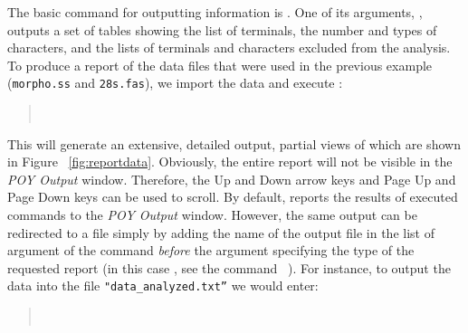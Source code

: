 {The basic command for outputting information is . One of its arguments, , 
outputs a set of tables showing the list of terminals, the number and types of characters, and the lists of terminals and 
characters excluded from the analysis. To produce a report of the data files that were used in the previous example 
(\texttt{morpho.ss} and \texttt{28s.fas}), we import the data and execute :
\begin{quote}
    \\
\end{quote}
This will generate an extensive, detailed output, partial views of which are shown in Figure ~\ref{fig:reportdata}. 
Obviously, the entire report will not be visible in the \emph{POY Output} window. Therefore, the Up and Down 
arrow keys and Page Up and Page Down keys can be used to scroll.  By default, \poy reports the results of executed 
commands to the \emph{POY Output} window. However, the same output can be redirected to a file simply by adding 
the name of the output file in the list of argument of the command  \emph{before} the argument 
specifying the type of the requested report (in this case , see the command~ ). For 
instance, to output the data into the file \texttt{"data\_analyzed.txt''} we would enter:
\begin{quote}
    \\
\end{quote}

}
